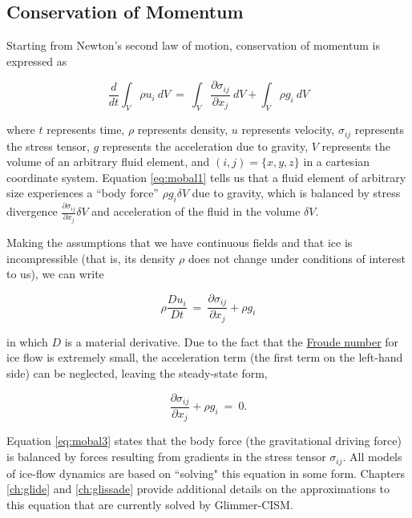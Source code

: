 \subsection{Conservation of Momentum}

Starting from Newton's second law of motion, conservation of momentum is expressed as

\begin{equation}
\frac{d} {dt} \int_{V}\rho u_{i}~dV ~ = ~ \int_{V} \frac{\partial \sigma_{ij}} {\partial x_{j}} ~dV +  \int_{V} \rho g_{i}~dV
\label{eq:mobal1}
\end{equation}

where $t$ represents time, $\rho$ represents density, $u$ represents
velocity, $\sigma_{ij}$ represents the stress tensor, $g$ represents the
acceleration due to gravity, $V$ represents the volume of an arbitrary
fluid element, and $(i,j)= \{x, y, z\}$ in a cartesian coordinate
system. Equation \eqref{eq:mobal1} tells us that a fluid element of arbitrary size 
experiences a ``body force'' $\rho g_{i}\delta V$ due to gravity, which is balanced by 
stress divergence $\frac{\partial \sigma_{ij}} {\partial x_{j}} \delta V$ and acceleration
of the fluid in the volume $\delta V$. 

Making the assumptions that we have continuous fields and that ice is incompressible (that is, 
its density $\rho$ does not change under conditions of interest to us), we can write

\begin{equation}
\rho \frac{D u_{i}}{D t}~=~\frac{\partial \sigma_{ij}}{\partial x_{j}} + \rho g_{i}
\label{eq:mobal2}
\end{equation}

in which $D$ is a material derivative. Due to the fact that the \href{http://en.wikipedia.org/wiki/Froude_number}
{Froude number} for ice flow is extremely small, the acceleration term (the first term on the left-hand side) can be 
neglected, leaving the steady-state form, 

\begin{equation}
\frac{\partial \sigma_{ij}}{\partial x_{j}} + \rho g_{i} ~=~0.
\label{eq:mobal3}
\end{equation}

Equation \eqref{eq:mobal3} states that the body force (the gravitational driving force) is balanced by forces resulting from 
gradients in the stress tensor $\sigma_{ij}$. All models of ice-flow dynamics are based on ``solving" this equation in some form.
Chapters \ref{ch:glide} and \ref{ch:glissade} provide additional details on the approximations to this equation that are currently 
solved by Glimmer-CISM.


